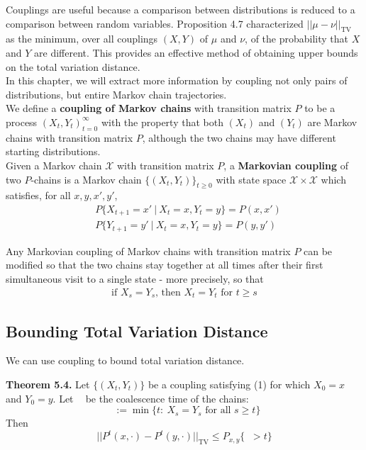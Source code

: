 \documentclass[12pt]{article}
\DeclareMathOperator*{\TV}{\text{TV}}
\DeclareMathOperator*{\couple}{\tau_{\text{couple}}}
\begin{document}
Couplings are useful because a comparison between distributions is reduced to a comparison between random variables. Proposition 4.7 characterized $|| \mu - \nu ||_{\TV}$ as the minimum, over all couplings $(X, Y)$ of $\mu$ and $\nu$, of the probability that $X$ and $Y$ are different. This provides an effective method of obtaining upper bounds on the total variation distance.\\

In this chapter, we will extract more information by coupling not only pairs of distributions, but entire Markov chain trajectories.\\

We define a \textbf{coupling of Markov chains} with transition matrix $P$ to be a process $(X_t, Y_t)_{t=0}^{\infty}$ with the property that both $(X_t)$ and $(Y_t)$ are Markov chains with transition matrix $P$, although the two chains may have different starting distributions.\\

Given a Markov chain $\mathcal{X}$ with transition matrix $P$, a \textbf{Markovian coupling} of two $P$-chains is a Markov chain $\{(X_t, Y_t)\}_{t \geq 0}$ with state space $\mathcal{X} \times \mathcal{X}$ which satisfies, for all $x, y, x', y'$,
\begin{align*}
&P\{X_{t+1} = x' \ | \ X_t = x, Y_t = y\} = P(x, x')\\
&P\{Y_{t+1} = y' \ | \ X_t = x, Y_t = y\} = P(y, y')
\end{align*}

Any Markovian coupling of Markov chains with transition matrix $P$ can be modified so that the two chains stay together at all times after their first simultaneous visit to a single state - more precisely, so that 
\begin{align}
\text{if } X_s = Y_s \text{, then } X_t = Y_t \text{ for } t \geq s
\end{align}

\subsection{Bounding Total Variation Distance}

We can use coupling to bound total variation distance.

\textbf{Theorem 5.4.} Let $\{(X_t, Y_t)\}$ be a coupling satisfying (1) for which $X_0 = x$ and $Y_0 = y$. Let $\couple$ be the coalescence time of the chains: $$\couple := \min \{t: \ X_s = Y_s \text{ for all } s \geq t\}$$ Then $$||P^t(x, \cdot) - P^t(y, \cdot)||_{\TV} \leq P_{x,y}\{\couple > t\}$$
\end{document}
